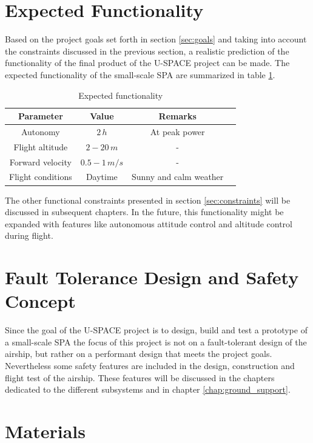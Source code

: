 \section{Expected Functionality}
%
Based on the project goals set forth in section \ref{sec:goals} and taking into account the constraints discussed in the previous section, a realistic prediction of the functionality of the final product of the \ac{U-SPACE} project can be made. The expected functionality of the small-scale \ac{SPA} are summarized in table \ref{tab:expected}.
%
\begin{table}[H]
\centering
\caption{Expected functionality}
\label{tab:expected}
\begin{tabular}{c c c c}
\hline
\textbf{Parameter} & \textbf{Value} & \textbf{Remarks}\\ \hline
Autonomy & $2\,h$ & At peak power\\
Flight altitude & $2-20\,m$ & -\\
Forward velocity & $0.5-1\,m/s$ & -\\
Flight conditions & Daytime & Sunny and calm weather\\
\hline
\end{tabular}
\end{table}
%
\noindent
The other functional constraints presented in section \ref{sec:constraints} will be discussed in subsequent chapters. In the future, this functionality might be expanded with features like autonomous attitude control and altitude control during flight.

\section{Fault Tolerance Design and Safety Concept}

Since the goal of the \ac{U-SPACE} project is to design, build and test a prototype of a small-scale \ac{SPA} the focus of this project is not on a fault-tolerant design of the airship, but rather on a performant design that meets the project goals. Nevertheless some safety features are included in the design, construction and flight test of the airship. These features will be discussed in the chapters dedicated to the different subsystems and in chapter \ref{chap:ground_support}.

\section{Materials}

